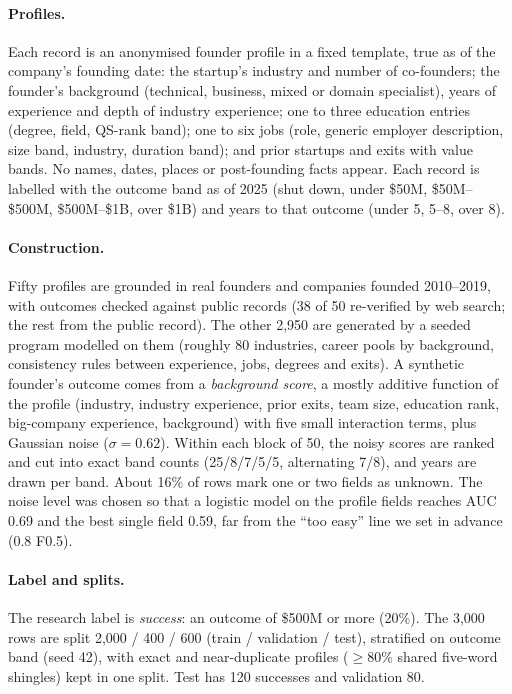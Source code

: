 \documentclass{article}
\begin{document}
\paragraph{Profiles.} Each record is an anonymised founder profile in a fixed template, true as of
the company's founding date: the startup's industry and number of co-founders; the founder's
background (technical, business, mixed or domain specialist), years of experience and depth of
industry experience; one to three education entries (degree, field, QS-rank band); one to six
jobs (role, generic employer description, size band, industry, duration band); and prior
startups and exits with value bands. No names, dates, places or post-founding facts appear. Each
record is labelled with the outcome band as of 2025 (shut down, under \$50M, \$50M--\$500M,
\$500M--\$1B, over \$1B) and years to that outcome (under 5, 5--8, over 8).

\paragraph{Construction.} Fifty profiles are grounded in real founders and companies founded
2010--2019, with outcomes checked against public records (38 of 50 re-verified by web search; the
rest from the public record). The other 2,950 are generated by a seeded program modelled on them
(roughly 80 industries, career pools by background, consistency rules between experience, jobs,
degrees and exits). A synthetic founder's outcome comes from a \emph{background score}, a mostly
additive function of the profile (industry, industry experience, prior exits, team size,
education rank, big-company experience, background) with five small interaction terms, plus
Gaussian noise ($\sigma = 0.62$). Within each block of 50, the noisy scores are ranked and cut
into exact band counts (25/8/7/5/5, alternating 7/8), and years are drawn per band. About 16\% of
rows mark one or two fields as unknown. The noise level was chosen so that a logistic model on
the profile fields reaches AUC 0.69 and the best single field 0.59, far from the ``too easy''
line we set in advance (0.8 F0.5).

\paragraph{Label and splits.} The research label is \emph{success}: an outcome of \$500M or more
(20\%). The 3,000 rows are split 2,000 / 400 / 600 (train / validation / test), stratified on
outcome band (seed 42), with exact and near-duplicate profiles ($\geq$80\% shared five-word
shingles) kept in one split. Test has 120 successes and validation 80.
\end{document}
